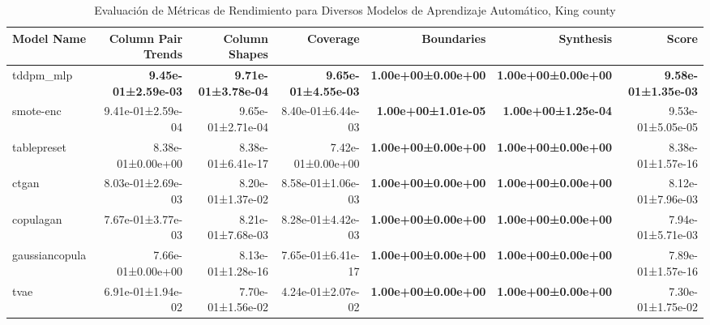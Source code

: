 \begin{table}[H]
\centering
\fontsize{7}{14}\selectfont
\caption{Evaluación de Métricas de Rendimiento para Diversos Modelos de Aprendizaje Automático, King county}
\label{table-score-king county-a}
\begin{tabular}{|l|r|r|r|r|r|r|}
\hline
 \rowcolor[gray]{0.8}
Model Name & Column Pair Trends & Column Shapes & Coverage & Boundaries & Synthesis & \textbf{Score} \\
\hline tddpm\_mlp & \bfseries 9.45e-01±2.59e-03 & \bfseries 9.71e-01±3.78e-04 & \bfseries 9.65e-01±4.55e-03 & \bfseries 1.00e+00±0.00e+00 & \bfseries 1.00e+00±0.00e+00 & \bfseries 9.58e-01±1.35e-03 \\
\hline smote-enc & 9.41e-01±2.59e-04 & 9.65e-01±2.71e-04 & 8.40e-01±6.44e-03 & \bfseries 1.00e+00±1.01e-05 & \bfseries 1.00e+00±1.25e-04 & 9.53e-01±5.05e-05 \\
\hline tablepreset & 8.38e-01±0.00e+00 & 8.38e-01±6.41e-17 & 7.42e-01±0.00e+00 & \bfseries 1.00e+00±0.00e+00 & \bfseries 1.00e+00±0.00e+00 & 8.38e-01±1.57e-16 \\
\hline ctgan & 8.03e-01±2.69e-03 & 8.20e-01±1.37e-02 & 8.58e-01±1.06e-03 & \bfseries 1.00e+00±0.00e+00 & \bfseries 1.00e+00±0.00e+00 & 8.12e-01±7.96e-03 \\
\hline copulagan & 7.67e-01±3.77e-03 & 8.21e-01±7.68e-03 & 8.28e-01±4.42e-03 & \bfseries 1.00e+00±0.00e+00 & \bfseries 1.00e+00±0.00e+00 & 7.94e-01±5.71e-03 \\
\hline gaussiancopula & 7.66e-01±0.00e+00 & 8.13e-01±1.28e-16 & 7.65e-01±6.41e-17 & \bfseries 1.00e+00±0.00e+00 & \bfseries 1.00e+00±0.00e+00 & 7.89e-01±1.57e-16 \\
\hline tvae & 6.91e-01±1.94e-02 & 7.70e-01±1.56e-02 & 4.24e-01±2.07e-02 & \bfseries 1.00e+00±0.00e+00 & \bfseries 1.00e+00±0.00e+00 & 7.30e-01±1.75e-02 \\
\hline
\end{tabular}
\end{table}

